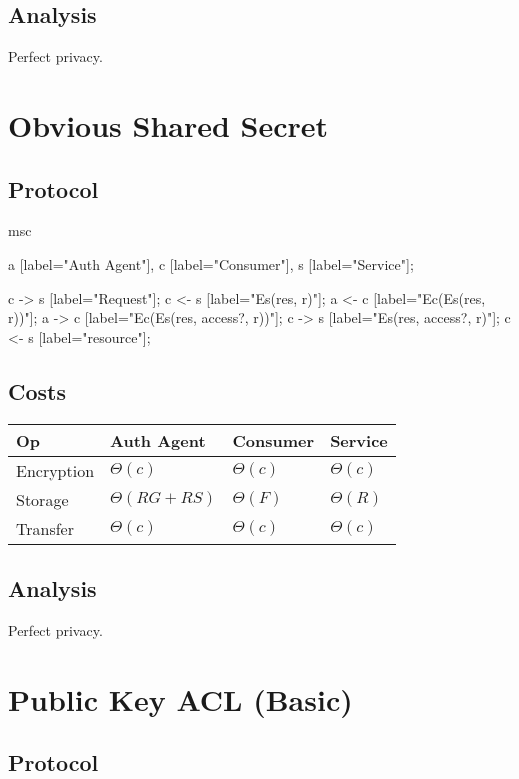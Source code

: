 \documentclass[pdftex,12pt,a4papaer]{article}
\begin{document}
\subsection{Analysis}

Perfect privacy.

\pagebreak

\section{Obvious Shared Secret}  %

\subsection{Protocol}

\begin{msc}
msc {
    a [label="Auth Agent"],
    c [label="Consumer"],
    s [label="Service"];

    c -> s [label="Request"];
    c <- s [label="Es(res, r)"];
    a <- c [label="Ec(Es(res, r))"];
    a -> c [label="Ec(Es(res, access?, r))"];
    c -> s [label="Es(res, access?, r)"];
    c <- s [label="resource"];
}
\end{msc}

\subsection{Costs}

\begin{tabular}{l|l|l|l}
 Op & Auth Agent & Consumer & Service \\ \hline
 Encryption & $\Theta(c)$ & $\Theta(c)$ & $\Theta(c)$ \\
    Storage & $\Theta(RG+RS)$ & $\Theta(F)$ & $\Theta(R)$ \\
    Transfer & $\Theta(c)$ & $\Theta(c)$ & $\Theta(c)$
\end{tabular}

\subsection{Analysis}

Perfect privacy.

\pagebreak

\section{Public Key ACL (Basic)}  %

\subsection{Protocol}
\end{document}
